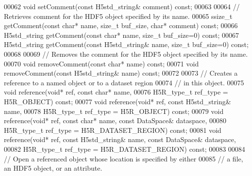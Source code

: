 \begin{DoxyCode}
00062         \textcolor{keywordtype}{void} setComment(\textcolor{keyword}{const} H5std\_string& comment) \textcolor{keyword}{const};
00063 
00064         \textcolor{comment}{// Retrieves comment for the HDF5 object specified by its name.}
00065         ssize\_t getComment(\textcolor{keyword}{const} \textcolor{keywordtype}{char}* name, \textcolor{keywordtype}{size\_t} buf\_size, \textcolor{keywordtype}{char}* comment) \textcolor{keyword}{const};
00066         H5std\_string getComment(\textcolor{keyword}{const} \textcolor{keywordtype}{char}* name, \textcolor{keywordtype}{size\_t} buf\_size=0) \textcolor{keyword}{const};
00067         H5std\_string getComment(\textcolor{keyword}{const} H5std\_string& name, \textcolor{keywordtype}{size\_t} buf\_size=0) \textcolor{keyword}{const};
00068 
00069         \textcolor{comment}{// Removes the comment for the HDF5 object specified by its name.}
00070         \textcolor{keywordtype}{void} removeComment(\textcolor{keyword}{const} \textcolor{keywordtype}{char}* name) \textcolor{keyword}{const};
00071         \textcolor{keywordtype}{void} removeComment(\textcolor{keyword}{const} H5std\_string& name) \textcolor{keyword}{const};
00072 
00073         \textcolor{comment}{// Creates a reference to a named object or to a dataset region}
00074         \textcolor{comment}{// in this object.}
00075         \textcolor{keywordtype}{void} reference(\textcolor{keywordtype}{void}* ref, \textcolor{keyword}{const} \textcolor{keywordtype}{char}* name, 
00076                         H5R\_type\_t ref\_type = H5R\_OBJECT) \textcolor{keyword}{const};
00077         \textcolor{keywordtype}{void} reference(\textcolor{keywordtype}{void}* ref, \textcolor{keyword}{const} H5std\_string& name,
00078                         H5R\_type\_t ref\_type = H5R\_OBJECT) \textcolor{keyword}{const};
00079         \textcolor{keywordtype}{void} reference(\textcolor{keywordtype}{void}* ref, \textcolor{keyword}{const} \textcolor{keywordtype}{char}* name, \textcolor{keyword}{const} DataSpace& dataspace,
00080                         H5R\_type\_t ref\_type = H5R\_DATASET\_REGION) \textcolor{keyword}{const};
00081         \textcolor{keywordtype}{void} reference(\textcolor{keywordtype}{void}* ref, \textcolor{keyword}{const} H5std\_string& name, \textcolor{keyword}{const} DataSpace& dataspace,
00082                         H5R\_type\_t ref\_type = H5R\_DATASET\_REGION) \textcolor{keyword}{const};
00083 
00084         \textcolor{comment}{// Open a referenced object whose location is specified by either}
00085         \textcolor{comment}{// a file, an HDF5 object, or an attribute.}

\end{DoxyCode}
